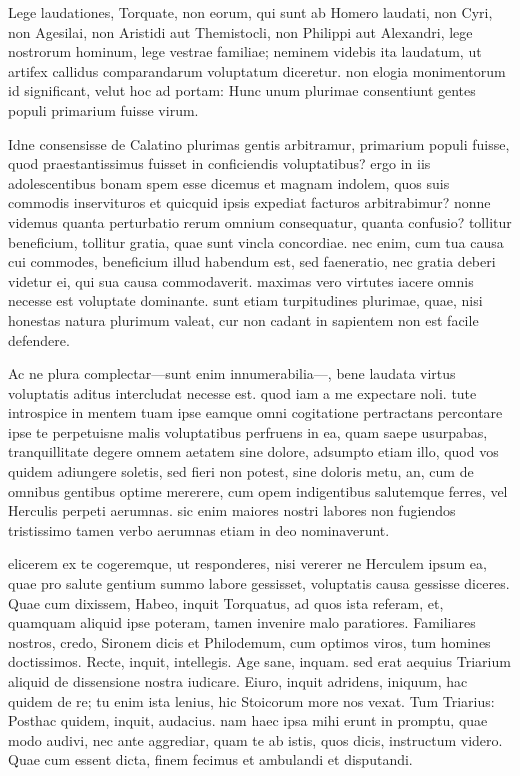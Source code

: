  Lege laudationes, Torquate, non eorum, qui sunt ab Homero laudati, non Cyri, non Agesilai, non Aristidi aut Themistocli, non Philippi aut Alexandri, lege nostrorum hominum, lege vestrae familiae; neminem videbis ita laudatum, ut artifex callidus comparandarum voluptatum diceretur. non elogia monimentorum id significant, velut hoc ad portam: Hunc unum plurimae consentiunt gentes populi primarium fuisse virum.

 Idne consensisse de Calatino plurimas gentis arbitramur, primarium populi fuisse, quod praestantissimus fuisset in conficiendis voluptatibus? ergo in iis adolescentibus bonam spem esse dicemus et magnam indolem, quos suis commodis inservituros et quicquid ipsis expediat facturos arbitrabimur? nonne videmus quanta perturbatio rerum omnium consequatur, quanta confusio? tollitur beneficium, tollitur gratia, quae sunt vincla concordiae. nec enim, cum tua causa cui commodes, beneficium illud habendum est, sed faeneratio, nec gratia deberi videtur ei, qui sua causa commodaverit. maximas vero virtutes iacere omnis necesse est voluptate dominante. sunt etiam turpitudines plurimae, quae, nisi honestas natura plurimum valeat, cur non cadant in sapientem non est facile defendere.

 Ac ne plura complectar—sunt enim innumerabilia—, bene laudata virtus voluptatis aditus intercludat necesse est. quod iam a me expectare noli. tute introspice in mentem tuam ipse eamque omni cogitatione pertractans percontare ipse te perpetuisne malis voluptatibus perfruens in ea, quam saepe usurpabas, tranquillitate degere omnem aetatem sine dolore, adsumpto etiam illo, quod vos quidem adiungere soletis, sed fieri non potest, sine doloris metu, an, cum de omnibus gentibus optime mererere, cum opem indigentibus salutemque ferres, vel Herculis perpeti aerumnas. sic enim maiores nostri labores non fugiendos tristissimo tamen verbo aerumnas etiam in deo nominaverunt.

 elicerem ex te cogeremque, ut responderes, nisi vererer ne Herculem ipsum ea, quae pro salute gentium summo labore gessisset, voluptatis causa gessisse diceres. Quae cum dixissem, Habeo, inquit Torquatus, ad quos ista referam, et, quamquam aliquid ipse poteram, tamen invenire malo paratiores. Familiares nostros, credo, Sironem dicis et Philodemum, cum optimos viros, tum homines doctissimos. Recte, inquit, intellegis. Age sane, inquam. sed erat aequius Triarium aliquid de dissensione nostra iudicare. Eiuro, inquit adridens, iniquum, hac quidem de re; tu enim ista lenius, hic Stoicorum more nos vexat. Tum Triarius: Posthac quidem, inquit, audacius. nam haec ipsa mihi erunt in promptu, quae modo audivi, nec ante aggrediar, quam te ab istis, quos dicis, instructum videro. Quae cum essent dicta, finem fecimus et ambulandi et disputandi.

